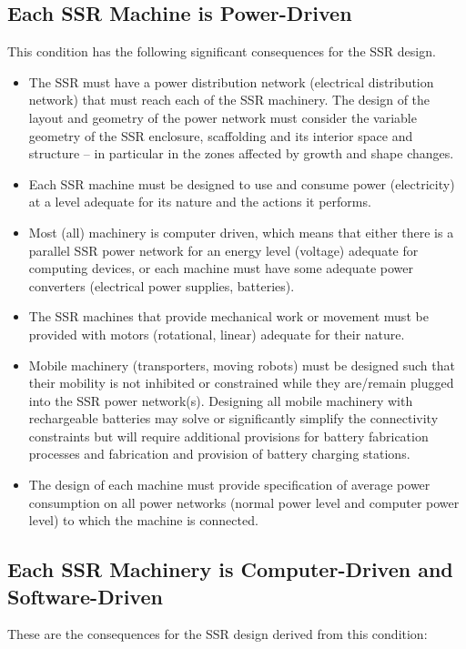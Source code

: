 \bigskip

\subsection[Each SSR Machine is Power{}-Driven]{Each SSR Machine is
Power-Driven}
\hypertarget{RefHeading3130306210128}{}This condition has the following
significant consequences for the SSR design.


\bigskip

\begin{itemize}
\item The SSR must have a power distribution network (electrical
distribution network) that must reach each of the SSR machinery. The
design of the layout and geometry of the power network must consider
the variable geometry of the SSR enclosure, scaffolding and its
interior space and structure – in particular in the zones affected by
growth and shape changes.
\item Each SSR machine must be designed to use and consume power
(electricity) at a level adequate for its nature and the actions it
performs. 
\item Most (all) machinery is computer driven, which means that either
there is a parallel SSR power network for an energy level (voltage)
adequate for computing devices, or each machine must have some adequate
power converters (electrical power supplies, batteries).
\item The SSR machines that provide mechanical work or movement must be
provided with motors (rotational, linear) adequate for their nature.
\item Mobile machinery (transporters, moving robots) must be designed
such that their mobility is not inhibited or constrained while they
are/remain plugged into the SSR power network(s).  Designing all mobile
machinery with rechargeable batteries may solve or significantly
simplify the connectivity constraints but will require additional
provisions for battery fabrication processes and fabrication and
provision of battery charging stations.
\item The design of each machine must provide specification of average
power consumption on all power networks (normal power level and
computer power level) to which the machine is connected.
\end{itemize}
\subsection[Each SSR Machinery is Computer{}-Driven and
Software{}-Driven]{Each SSR Machinery is Computer-Driven and
Software-Driven}
\hypertarget{RefHeading3132306210128}{}These are the consequences for
the SSR design derived from this condition:


